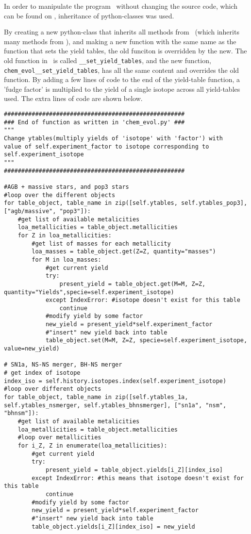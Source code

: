 
\label{sec:mod-omega}

In order to manipulate the program \omegamodel\ without changing the source code, which can be found on , inheritance of python-classes was used.

By creating a new python-class that inherits all methods from \omegamodel\ (which inherits many methods from \chemevol ), and making a new function with the same name as the function that sets the yield tables, the old funciton is overridden by the new.
The old function in \chemevol\ is called \verb|__set_yield_tables|, and the new function, \verb|chem_evol__set_yield_tables|, has all the same content and overrides the old function. By adding a few lines of code to the end of the yield-table function, a 'fudge factor' is multiplied to the yield of a single isotope across all yield-tables used.
The extra lines of code are shown below.

\begin{lstlisting}[style=custompython, caption={Some caption}]
####################################################
### End of function as written in 'chem_evol.py' ###
""" 
Change ytables(multiply yields of 'isotope' with 'factor') with
value of self.experiment_factor to isotope corresponding to self.experiment_isotope
"""
####################################################

#AGB + massive stars, and pop3 stars
#loop over the different objects
for table_object, table_name in zip([self.ytables, self.ytables_pop3], ["agb/massive", "pop3"]):
    #get list of available metalicities
    loa_metallicities = table_object.metallicities
    for Z in loa_metallicities:
        #get list of masses for each metallicity
        loa_masses = table_object.get(Z=Z, quantity="masses")
        for M in loa_masses:
            #get current yield
            try:
                present_yield = table_object.get(M=M, Z=Z, quantity="Yields",specie=self.experiment_isotope)
            except IndexError: #isotope doesn't exist for this table
                continue
            #modify yield by some factor
            new_yield = present_yield*self.experiment_factor
            #"insert" new yield back into table
            table_object.set(M=M, Z=Z, specie=self.experiment_isotope, value=new_yield)

# SN1a, NS-NS merger, BH-NS merger
# get index of isotope
index_iso = self.history.isotopes.index(self.experiment_isotope)
#loop over different objects
for table_object, table_name in zip([self.ytables_1a, self.ytables_nsmerger, self.ytables_bhnsmerger], ["sn1a", "nsm", "bhnsm"]):
    #get list of available metalicities
    loa_metallicities = table_object.metallicities
    #loop over metallicities
    for i_Z, Z in enumerate(loa_metallicities):
        #get current yield
        try:
            present_yield = table_object.yields[i_Z][index_iso]
        except IndexError: #this means that isotope doesn't exist for this table
            continue
        #modify yield by some factor
        new_yield = present_yield*self.experiment_factor
        #"insert" new yield back into table
        table_object.yields[i_Z][index_iso] = new_yield
\end{lstlisting}
